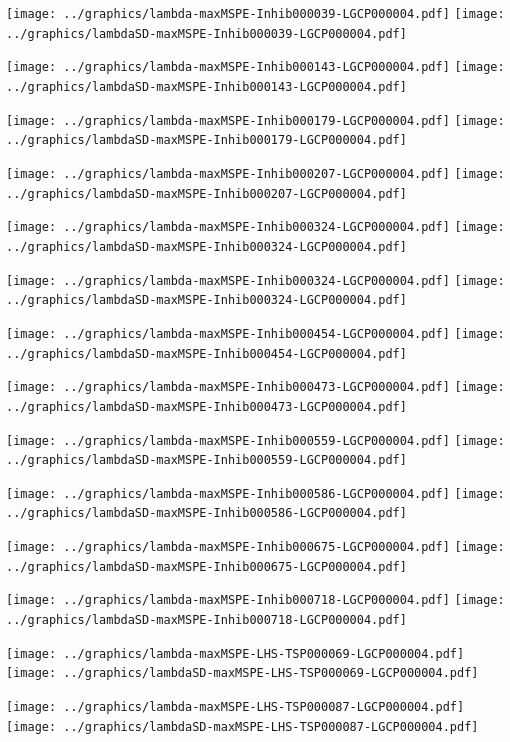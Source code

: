 \documentclass[review]{elsarticle}
\begin{document}
\texttt{[image: ../graphics/lambda-maxMSPE-Inhib000039-LGCP000004.pdf]}
\texttt{[image: ../graphics/lambdaSD-maxMSPE-Inhib000039-LGCP000004.pdf]}

\texttt{[image: ../graphics/lambda-maxMSPE-Inhib000143-LGCP000004.pdf]}
\texttt{[image: ../graphics/lambdaSD-maxMSPE-Inhib000143-LGCP000004.pdf]}

\texttt{[image: ../graphics/lambda-maxMSPE-Inhib000179-LGCP000004.pdf]}
\texttt{[image: ../graphics/lambdaSD-maxMSPE-Inhib000179-LGCP000004.pdf]}

\texttt{[image: ../graphics/lambda-maxMSPE-Inhib000207-LGCP000004.pdf]}
\texttt{[image: ../graphics/lambdaSD-maxMSPE-Inhib000207-LGCP000004.pdf]}

\texttt{[image: ../graphics/lambda-maxMSPE-Inhib000324-LGCP000004.pdf]}
\texttt{[image: ../graphics/lambdaSD-maxMSPE-Inhib000324-LGCP000004.pdf]}

\texttt{[image: ../graphics/lambda-maxMSPE-Inhib000324-LGCP000004.pdf]}
\texttt{[image: ../graphics/lambdaSD-maxMSPE-Inhib000324-LGCP000004.pdf]}

\texttt{[image: ../graphics/lambda-maxMSPE-Inhib000454-LGCP000004.pdf]}
\texttt{[image: ../graphics/lambdaSD-maxMSPE-Inhib000454-LGCP000004.pdf]}

\texttt{[image: ../graphics/lambda-maxMSPE-Inhib000473-LGCP000004.pdf]}
\texttt{[image: ../graphics/lambdaSD-maxMSPE-Inhib000473-LGCP000004.pdf]}

\texttt{[image: ../graphics/lambda-maxMSPE-Inhib000559-LGCP000004.pdf]}
\texttt{[image: ../graphics/lambdaSD-maxMSPE-Inhib000559-LGCP000004.pdf]}

\texttt{[image: ../graphics/lambda-maxMSPE-Inhib000586-LGCP000004.pdf]}
\texttt{[image: ../graphics/lambdaSD-maxMSPE-Inhib000586-LGCP000004.pdf]}

\texttt{[image: ../graphics/lambda-maxMSPE-Inhib000675-LGCP000004.pdf]}
\texttt{[image: ../graphics/lambdaSD-maxMSPE-Inhib000675-LGCP000004.pdf]}

\texttt{[image: ../graphics/lambda-maxMSPE-Inhib000718-LGCP000004.pdf]}
\texttt{[image: ../graphics/lambdaSD-maxMSPE-Inhib000718-LGCP000004.pdf]}

\texttt{[image: ../graphics/lambda-maxMSPE-LHS-TSP000069-LGCP000004.pdf]}
\texttt{[image: ../graphics/lambdaSD-maxMSPE-LHS-TSP000069-LGCP000004.pdf]}

\texttt{[image: ../graphics/lambda-maxMSPE-LHS-TSP000087-LGCP000004.pdf]}
\texttt{[image: ../graphics/lambdaSD-maxMSPE-LHS-TSP000087-LGCP000004.pdf]}
\end{document}

